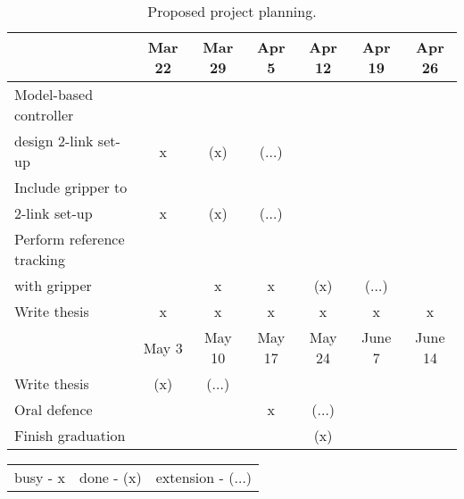 \begin{table}[H]
\begin{tabular}{p{4.8cm}cccccc}
                                                     & Mar 22 & Mar 29   & Apr 5     & Apr 12  & Apr 19 & Apr 26   \\ \hline
    Model-based controller \\ design 2-link set-up   & x      &  (x)     & ($\dots$) &         &        &         \\ 
    Include gripper to \\ 2-link set-up              &    x    &    (x)    &    ($\dots$)     &&         &         \\  
    Perform reference tracking \\ with gripper  &    &    x      &  x         &  (x)      &   ($\dots$)    &        \\
    Write thesis                                     & x      & x        &   x      &      x      &       x  &  x   \\ \hline
  
                                                     & May  3  & May 10      & May 17  & May 24     & June 7 & June 14 \\\hline
    Write thesis                                     & (x)       & ($\dots$) &         &            &         &    \\
    Oral defence                                       &       &             &   x     &      ($\dots$)       &                &       \\
    Finish graduation                                 &     &            &          &        (x)        &       &    \\ \hline 

    \end{tabular}
    \caption{Proposed project planning.}
    \label{tab1:projectplanning}
\end{table}

\begin{table}[H]
    \centering
    \begin{tabular}{ccc}
       busy - x & done - (x) & extension - ($\dots$)
    \end{tabular}
\end{table}


